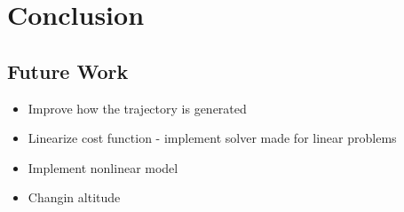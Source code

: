 \chapter{Conclusion}


\section{Future Work}

\begin{itemize}
	\item Improve how the trajectory is generated
	\item Linearize cost function - implement solver made for linear problems
	\item Implement nonlinear model
	\item Changin altitude
\end{itemize}